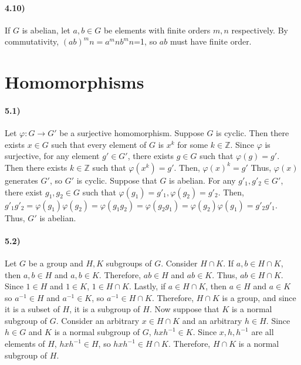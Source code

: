 \documentclass{article}
\begin{document}
\paragraph{4.10)}

If $G$ is abelian, let $a,b\in G$ be elements with finite orders $m,n$ respectively. By commutativity, $(ab)^mn=a^mnb^mn$=1, so $ab$ must have finite order.

\section{Homomorphisms}

\paragraph{5.1)}
Let $\varphi :G\to G'$ be a surjective homomorphism. Suppose $G$ is cyclic. Then there exists $x\in G$ such that every element of $G$ is $x^k$ for some $k\in \mathbb{Z}$. Since $\varphi$ is surjective, for any element $g'\in G'$, there exists $g\in G$ such that $\varphi (g)=g'$. Then there exists $k\in \mathbb{Z}$ such that $\varphi (x^k)=g'$. Then, $\varphi (x)^k=g'$ Thus, $\varphi (x)$ generates $G'$, so $G'$ is cyclic.\newline
Suppose that $G$ is abelian. For any $g'_1,g'_2\in G'$, there exist $g_1,g_2\in G$ such that $\varphi (g_1)=g'_1, \varphi (g_2)=g'_2$. Then, $g'_1g'_2=\varphi (g_1)\varphi (g_2)=\varphi (g_1g_2)=\varphi(g_2g_1)=\varphi (g_2)\varphi (g_1)=g'_2g'_1$. Thus, $G'$ is abelian.

\paragraph{5.2)}
Let $G$ be a group and $H,K$ subgroups of $G$. Consider $H\cap K$. If $a,b\in H\cap K$, then $a,b\in H$ and $a,b\in K$. Therefore, $ab\in H$ and $ab\in K$. Thus, $ab\in H\cap K$. Since $1\in H$ and $1\in K$, $1\in H\cap K$. Lastly, if $a\in H\cap K$, then $a\in H$ and $a\in K$ so $a^{-1}\in H$ and $a^{-1}\in K$, so $a^{-1}\in H\cap K$. Therefore, $H\cap K$ is a group, and since it is a subset of $H$, it is a subgroup of $H$.\newline
Now suppose that $K$ is a normal subgroup of $G$. Consider an arbitrary $x\in H\cap K$ and an arbitrary $h\in H$. Since $h\in G$ and $K$ is a normal subgroup of $G$, $hxh^{-1}\in K$. Since $x,h,h^{-1}$ are all elements of $H$,  $hxh^{-1}\in H$, so $hxh^{-1}\in H\cap K$. Therefore, $H\cap K$ is a normal subgroup of $H$.
\end{document}
